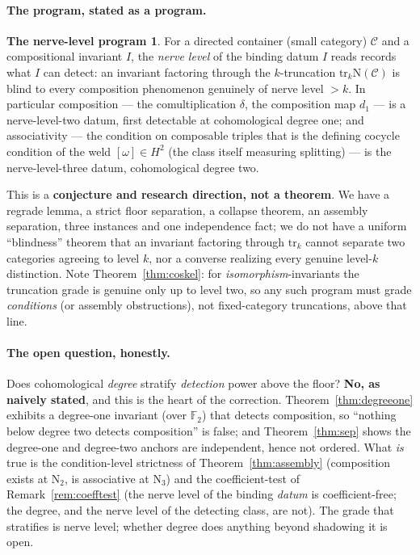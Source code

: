 \documentclass[11pt]{article}
\theoremstyle{definition}
\newtheorem*{program}{The nerve-level program}
\newcommand{\tr}{\mathrm{tr}}
\newcommand{\F}{\mathbb{F}}
\newcommand{\cC}{\mathcal{C}}
\newcommand{\Nerve}{\mathrm{N}}
\begin{document}
\paragraph{The program, stated as a program.}
\begin{program}
For a directed container (small category) $\cC$ and a compositional invariant $I$, the \emph{nerve
level} of the binding datum $I$ reads records what $I$ can detect: an invariant factoring through the
$k$-truncation $\tr_k\Nerve(\cC)$ is blind to every composition phenomenon genuinely of nerve level
$>k$. In particular composition --- the comultiplication $\delta$, the composition map $d_1$ --- is a
nerve-level-two datum, first detectable at cohomological degree one; and associativity --- the
condition on composable triples that is the defining cocycle condition of the weld $[\omega]\in H^2$
(the class itself measuring splitting) --- is the nerve-level-three datum, cohomological degree two.
\end{program}
This is a \textbf{conjecture and research direction, not a theorem}. We have a regrade lemma, a strict
floor separation, a collapse theorem, an assembly separation, three instances and one independence
fact; we do not have a uniform ``blindness'' theorem that an invariant factoring through $\tr_k$ cannot
separate two categories agreeing to level $k$, nor a converse realizing every genuine level-$k$
distinction. Note Theorem~\ref{thm:coskel}: for \emph{isomorphism}-invariants the truncation grade is
genuine only up to level two, so any such program must grade \emph{conditions} (or assembly
obstructions), not fixed-category truncations, above that line.

\paragraph{The open question, honestly.}
Does cohomological \emph{degree} stratify \emph{detection} power above the floor? \textbf{No, as
naively stated}, and this is the heart of the correction. Theorem~\ref{thm:degreeone} exhibits a
degree-one invariant (over $\F_2$) that detects composition, so ``nothing below degree two detects
composition'' is false; and Theorem~\ref{thm:sep} shows the degree-one and degree-two anchors are
independent, hence not ordered. What \emph{is} true is the condition-level strictness of
Theorem~\ref{thm:assembly} (composition exists at $\Nerve_2$, is associative at $\Nerve_3$) and the
coefficient-test of Remark~\ref{rem:coefftest} (the nerve level of the binding \emph{datum} is
coefficient-free; the degree, and the nerve level of the detecting class, are not). The
grade that stratifies is nerve level; whether degree does anything beyond shadowing it is open.
\end{document}
